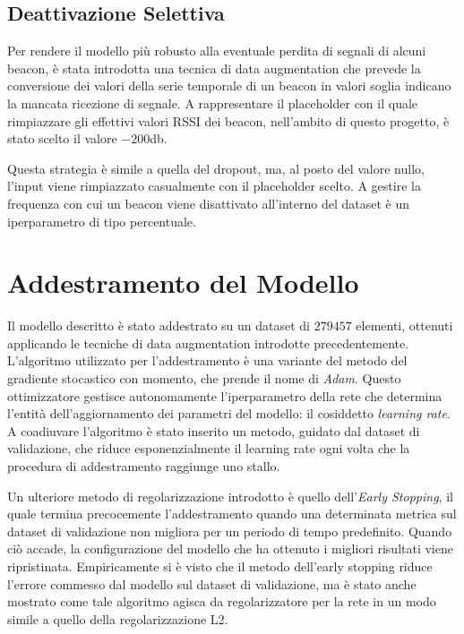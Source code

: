 \subsection{Deattivazione Selettiva}
Per rendere il modello più robusto alla eventuale perdita di segnali di alcuni
beacon, è stata introdotta una tecnica di data augmentation che prevede la
conversione dei valori della serie temporale di un beacon in valori soglia
indicano la mancata ricezione di segnale. A rappresentare il placeholder con il
quale rimpiazzare gli effettivi valori RSSI dei beacon, nell'ambito di questo
progetto, è stato scelto il valore $-200$db.

Questa strategia è simile a quella del dropout, ma, al posto del valore nullo,
l'input viene rimpiazzato casualmente con il placeholder scelto. A gestire la
frequenza con cui un beacon viene disattivato all'interno del dataset è un
iperparametro di tipo percentuale.
\section{Addestramento del Modello}
Il modello descritto è stato addestrato su un dataset di $279457$ elementi,
ottenuti applicando le tecniche di data augmentation introdotte
precedentemente. L'algoritmo utilizzato per l'addestramento è una variante del
metodo del gradiente stocastico con momento, che prende il nome di \emph{Adam}.
Questo ottimizzatore gestisce autonomamente l'iperparametro della rete che
determina l'entità dell'aggiornamento dei parametri del modello: il cosiddetto
\emph{learning rate}. A coadiuvare l'algoritmo è stato inserito un metodo,
guidato dal dataset di validazione, che riduce esponenzialmente il learning
rate ogni volta che la procedura di addestramento raggiunge uno stallo.

Un ulteriore metodo di regolarizzazione introdotto è quello dell'\emph{Early %
  Stopping}, il quale termina precocemente l'addestramento quando una
determinata metrica sul dataset di validazione non migliora per un periodo di
tempo predefinito. Quando ciò accade, la configurazione
del modello che ha ottenuto i migliori risultati viene ripristinata.
Empiricamente si è visto che il metodo dell'early stopping riduce l'errore
commesso dal modello sul dataset di validazione, ma è stato anche mostrato come
tale algoritmo agisca da regolarizzatore per la rete in un modo simile a quello
della regolarizzazione L2\cite{bishop-regularization}.

